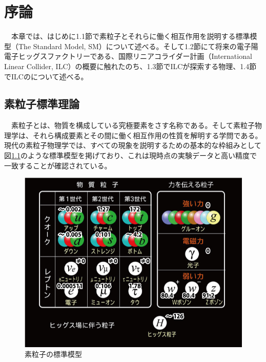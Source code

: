 
\chapter{序論} \label{sec:Intruduction}
　本章では、はじめに1.1節で素粒子とそれらに働く相互作用を説明する標準模型（The Standard Model, SM）について述べる。そして1.2節にて将来の電子陽電子ヒッグスファクトリーである、国際リニアコライダー計画（International Linear Collider, ILC）の概要に触れたのち、1.3節でILCが探索する物理、1.4節でILCのについて述べる。
\section{素粒子標準理論}
　素粒子とは、物質を構成している究極要素をさす名称である。そして素粒子物理学は、それら構成要素とその間に働く相互作用の性質を解明する学問である。現代の素粒子物理学では、すべての現象を説明するための基本的な枠組みとして図\ref{sm}のような標準模型を掲げており、これは現時点の実験データと高い精度で一致することが確認されている。\\

\begin{figure}[htbp]
	\begin{center}
 \includegraphics[keepaspectratio, scale=0.4]
 	{Figure/Introduction/sm.jpg}
 		\caption{素粒子の標準模型}
 		\label{sm}
	\end{center}
\end{figure}

